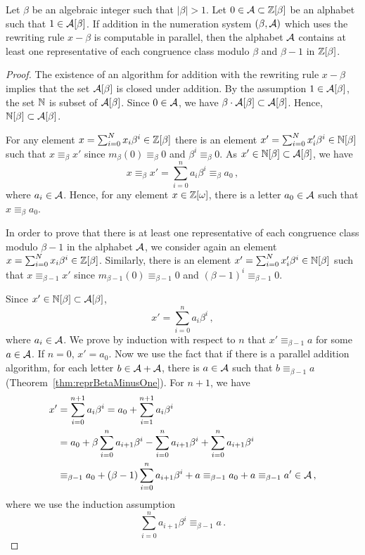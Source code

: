 \begin{thm}
Let $\beta$ be an algebraic integer such that $|\beta|>1$. Let $0\in \mathcal{A}\subset \mathbb{Z}[\beta]$ be an alphabet such that $1\in \mathcal{A}[\beta]$. If addition in the numeration system $(\beta, \mathcal{A})$ which uses the rewriting rule $x-\beta$ is computable in parallel, then the alphabet $\mathcal{A}$ contains at least one representative of each congruence class modulo $\beta$ and $\beta-1$ in $\mathbb{Z}[\beta]$. 
\label{thm:representativesInAlphabet}
\end{thm}
\begin{proof}
The existence of an algorithm for addition with the rewriting rule $x-\beta$ implies that the set $\mathcal{A}[\beta]$ is closed under addition. By the assumption $1\in \mathcal{A}[\beta]$, the set $\mathbb{N}$ is subset of  $\mathcal{A}[\beta]$. Since $0\in\mathcal{A}$, we have $\beta \cdot \mathcal{A}[\beta] \subset \mathcal{A}[\beta]$. Hence, $\mathbb{N}[\beta] \subset \mathcal{A}[\beta]$.

For any element  $x=\sum_{i=0}^N x_i \beta^i\in \mathbb{Z}[\beta]$ there is an element $x'=\sum_{i=0}^N x'_i \beta^i\in \mathbb{N}[\beta]$ such that $x\equiv_\beta x'$  since $m_\beta (0)\equiv_\beta 0$ and $\beta^i\equiv_\beta 0$. As $x'\in \mathbb{N}[\beta] \subset \mathcal{A}[\beta]$, we have
$$
x\equiv_\beta x'=\sum_{i=0}^{n}a_i\beta^i \equiv_\beta a_0\,,
$$
where $a_i\in \mathcal{A}$. Hence, for any element $x\in\mathbb{Z}[\omega]$, there is a letter $a_0\in\mathcal{A}$ such that $x\equiv_\beta a_0$.

In order to prove that there is at least one representative of each congruence class modulo $\beta-1$ in the alphabet $\mathcal{A}$, we consider again an element $x=\sum_{i=0}^N x_i \beta^i\in \mathbb{Z}[\beta]$. Similarly, there is an element $x'=\sum_{i=0}^N x'_i \beta^i\in \mathbb{N}[\beta]$ such that $x\equiv_{\beta-1} x'$  since $m_{\beta-1} (0)\equiv_{\beta-1} 0$ and $(\beta-1)^i\equiv_{\beta-1} 0$.

Since $x'\in \mathbb{N}[\beta]\subset \mathcal{A}[\beta]$,
$$
x'=\sum_{i=0}^{n}a_i\beta^i\,,
$$
where $a_i\in \mathcal{A}$. We prove by induction with respect to $n$ that $x'\equiv_{\beta-1} a$ for some $a\in\mathcal{A}$.
If $n=0$, $x'=a_0$. Now we use the fact that if there is a parallel addition algorithm, for each letter $b \in\mathcal{A}+\mathcal{A}$, there is $a\in\mathcal{A}$ such that $b \equiv_{\beta-1} a$ (Theorem~\ref{thm:reprBetaMinusOne}). For $n+1$, we have
\begin{align*}
x'&=\sum_{i=0}^{n+1}a_i\beta^i =a_0 + \sum_{i=1}^{n+1}a_{i}\beta^i\\
    &=a_0 + \beta \sum_{i=0}^{n}a_{i+1}\beta^i - \sum_{i=0}^{n}a_{i+1}\beta^i+ \sum_{i=0}^{n}a_{i+1}\beta^i \\
    &\equiv_{\beta-1} a_0 + (\beta-1)\sum_{i=0}^{n}a_{i+1}\beta^i + a \equiv_{\beta-1}a_0 +a \equiv_{\beta-1}a' \in\mathcal{A}\,,
\end{align*}
where we use the induction assumption
$$
\sum_{i=0}^{n}a_{i+1}\beta^i\equiv_{\beta-1} a\,.
$$
\end{proof}

